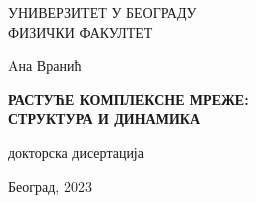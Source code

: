 
\sffamily
{}\selectfont
\thispagestyle{empty}

\begin{center}

\Large{
    УНИВЕРЗИТЕТ У БЕОГРАДУ \\
    ФИЗИЧКИ ФАКУЛТЕТ
}

\vspace{5.5cm}

\Large{
    Aна Вранић
}

\vspace{.5cm}

\LARGE{ \textbf{
    РАСТУЋЕ КОМПЛЕКСНЕ МРЕЖЕ:\\ СТРУКТУРА И ДИНАМИКА
}}

\vspace{.5cm}

\Large{
    докторска дисертација 
    
}
\vspace{9.1cm}
\Large{
    Београд, 2023
}
\end{center}


\pagebreak
\justify
\thispagestyle{empty}


